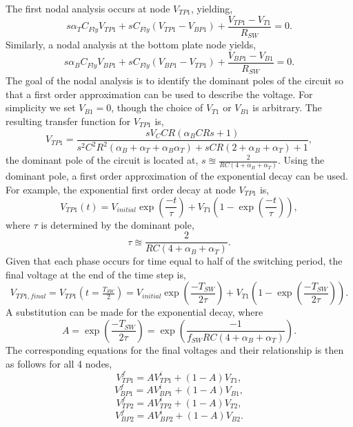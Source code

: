 	The first nodal analysis occurs at node $V_{TP1}$, yielding,
	\begin{equation}
		s\alpha_T C_{Fly} V_{TP1} + sC_{Fly}(V_{TP1} - V_{BP1}) + \frac{V_{TP1} - V_{T1}}{R_{SW}} = 0.
	\end{equation}
	Similarly, a nodal analysis at the bottom plate node yields,
	\begin{equation}
		s\alpha_B C_{Fly} V_{BP1} + sC_{Fly}(V_{BP1} - V_{TP1}) + \frac{V_{BP1} - V_{B1}}{R_{SW}} = 0.
	\end{equation}
	The goal of the nodal analysis is to identify the dominant poles of the circuit so that a first order approximation can be used to describe the voltage. For simplicity we set $V_{B1} = 0$, though the choice of $V_{T1}$ or $V_{B1}$ is arbitrary. The resulting transfer function for $V_{TP1}$ is, 
	\begin{equation}
		V_{TP1} = \frac{sV_CCR(\alpha_BCRs + 1)}{s^2C^2R^2(\alpha_B + \alpha_T + \alpha_B\alpha_T) + sCR(2+\alpha_B+\alpha_T) + 1},
	\end{equation}
	the dominant pole of the circuit is located at, $s \approxeq \frac{2}{RC(4 + \alpha_B + \alpha_T)}$. Using the dominant pole, a first order approximation of the exponential decay can be used. For example, the exponential first order decay at node $V_{TP1}$ is,
	\begin{equation}
		V_{TP1}(t) = V_{initial}\exp\left(\frac{-t}{\tau}\right) + V_{T1}\left(1 - \exp\left(\frac{-t}{\tau}\right)\right),
	\end{equation}
	where $\tau$ is determined by the dominant pole,
	\begin{equation}
		\tau \approxeq \frac{2}{RC(4 + \alpha_B + \alpha_T)}.
	\end{equation}
	Given that each phase occurs for time equal to half of the switching period, the final voltage at the end of the time step is,
	\begin{equation}
		V_{TP1,final} = V_{TP1}\left(t=\tfrac{T_{SW}}{2}\right) = V_{initial}\exp\left(\frac{-T_{SW}}{2\tau}\right) + V_{T1}\left(1 - \exp\left(\frac{-T_{SW}}{2\tau}\right)\right).
	\end{equation}
	A substitution can be made for the exponential decay, where
	\begin{equation}
		A = \exp\left(\frac{-T_{SW}}{2\tau}\right) = \exp\left(\frac{-1}{f_{SW}RC(4+\alpha_B+\alpha_T)}\right).
	\end{equation}
	The corresponding equations for the final voltages and their relationship is then as follows for all 4 nodes,
	\begin{equation}
		V_{TP1}^f = AV_{TP1}^i + (1-A)V_{T1},
	\end{equation}
	\begin{equation}
		V_{BP1}^f = AV_{BP1}^i + (1-A)V_{B1},
	\end{equation}
	\begin{equation}
		V_{TP2}^f = AV_{TP2}^i + (1-A)V_{T2},
	\end{equation}
	\begin{equation}
		V_{BP2}^f = AV_{BP2}^i + (1-A)V_{B2}.
	\end{equation}
	
